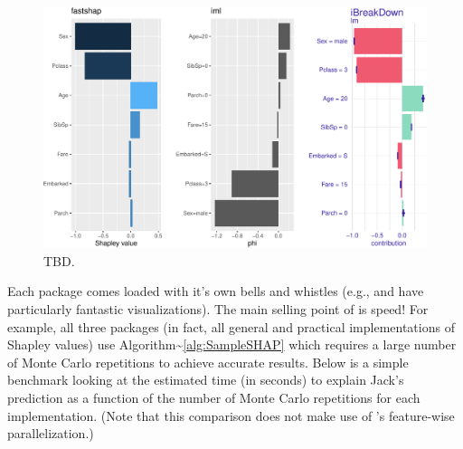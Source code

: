\begin{Schunk}
\begin{figure}[!htb]

{\centering \includegraphics[width=1\linewidth]{greenwell_files/figure-latex/titanic-jack-explanations-1} 

}

\caption[TBD]{TBD.}\label{fig:titanic-jack-explanations}
\end{figure}
\end{Schunk}

Each package comes loaded with it's own bells and whistles (e.g.,
 and  have particularly fantastic
visualizations). The main selling point of  is speed! For
example, all three packages (in fact, all general and practical
implementations of Shapley values) use
Algorithm\textasciitilde{}\ref{alg:SampleSHAP} which requires a large
number of Monte Carlo repetitions to achieve accurate results. Below is
a simple benchmark looking at the estimated time (in seconds) to explain
Jack's prediction as a function of the number of Monte Carlo repetitions
for each implementation. (Note that this comparison does not make use of
's feature-wise parallelization.)

